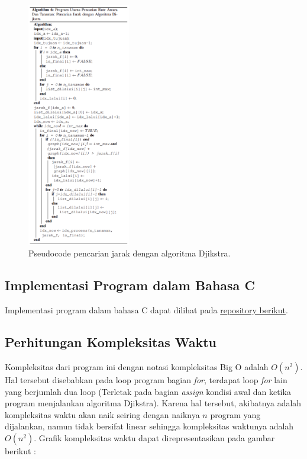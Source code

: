 \documentclass[conference]{IEEEtran}
\begin{document}
    \begin{figure}[H]
        \centerline{\includegraphics[width=0.4\textwidth]{./sources/cariJarak.png}}
        \caption{Pseudocode pencarian jarak dengan algoritma Djikstra.}
        \label{fig7}
    \end{figure} 

\subsection{Implementasi Program dalam Bahasa C}
    Implementasi program dalam bahasa C dapat dilihat
    pada \href{https://github.com/ReynaldoAverill/
    Tugas7PMC}{repository berikut}.

\subsection{Perhitungan Kompleksitas Waktu}
    Kompleksitas dari program ini dengan notasi kompleksitas
    Big O adalah $O(n^2)$. Hal tersebut disebabkan pada loop
    program bagian \textit{for}, terdapat loop \textit{for} lain yang berjumlah
    dua loop (Terletak pada bagian \textit{assign} kondisi awal dan ketika
    program menjalankan algoritma Djikstra). Karena hal tersebut,
    akibatnya adalah kompleksitas waktu akan naik seiring dengan
    naiknya $n$ program yang dijalankan, namun tidak bersifat
    linear sehingga kompleksitas waktunya adalah $O(n^2)$. Grafik
    kompleksitas waktu dapat direpresentasikan pada gambar berikut :
\end{document}
